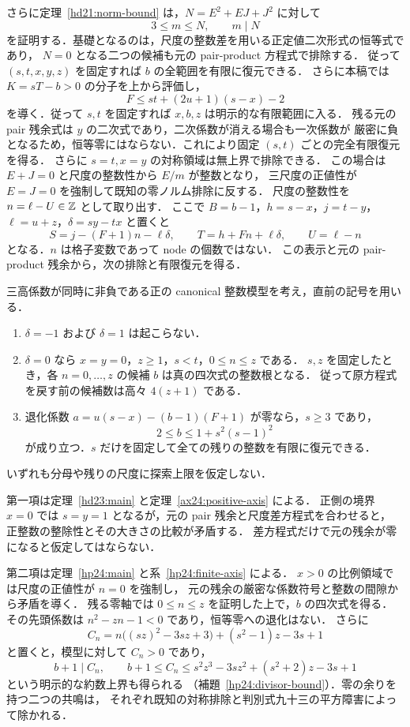 さらに定理~\ref{hd21:norm-bound} は，$N=E^2+EJ+J^2$ に対して
\[
 3\le m\le N,\qquad m\mid N
\]
を証明する．基礎となるのは，尺度の整数差を用いる正定値二次形式の恒等式であり，
$N=0$ となる二つの候補も元の pair-product 方程式で排除する．
従って $(s,t,x,y,z)$ を固定すれば $b$ の全範囲を有限に復元できる．
さらに本稿では $K=sT-b>0$ の分子を上から評価し，
\[
 F\le st+(2u+1)(s-x)-2
\]
を導く．従って $s,t$ を固定すれば $x,b,z$ は明示的な有限範囲に入る．
残る元の pair 残余式は $y$ の二次式であり，二次係数が消える場合も一次係数が
厳密に負となるため，恒等零にはならない．これにより固定 $(s,t)$ ごとの完全有限復元を得る．
さらに $s=t,x=y$ の対称領域は無上界で排除できる．
この場合は $E+J=0$ と尺度の整数性から $E/m$ が整数となり，
三尺度の正値性が $E=J=0$ を強制して既知の零ノルム排除に反する．
尺度の整数性を $n=\ell-U\in\mathbb Z$ として取り出す．
ここで $B=b-1$，$h=s-x$，$j=t-y$，$\ell=u+z$，$\delta=sy-tx$ と置くと
\[
 S=j-(F+1)n-\ell\delta,\qquad
 T=h+Fn+\ell\delta,\qquad U=\ell-n
\]
となる．$n$ は格子変数であって node の個数ではない．
この表示と元の pair-product 残余から，次の排除と有限復元を得る．

\begin{theorem}
\label{ar24:high-D-reductions}
三高係数が同時に非負である正の canonical 整数模型を考え，直前の記号を用いる．
\begin{enumerate}
\item $\delta=-1$ および $\delta=1$ は起こらない．
\item $\delta=0$ なら $x=y=0$，$z\ge1$，$s<t$，$0\le n\le z$ である．
$s,z$ を固定したとき，各 $n=0,\ldots,z$ の候補 $b$ は真の四次式の整数根となる．
従って原方程式を戻す前の候補数は高々 $4(z+1)$ である．
\item 退化係数 $a=u(s-x)-(b-1)(F+1)$ が零なら，$s\ge3$ であり，
\[
 2\le b\le1+s^2(s-1)^2
\]
が成り立つ．$s$ だけを固定して全ての残りの整数を有限に復元できる．
\end{enumerate}
いずれも分母や残りの尺度に探索上限を仮定しない．
\end{theorem}

第一項は定理~\ref{hd23:main} と定理~\ref{ax24:positive-axis} による．
正側の境界 $x=0$ では $s=y=1$ となるが，元の pair 残余と尺度差方程式を合わせると，
正整数の整除性とその大きさの比較が矛盾する．
差方程式だけで元の残余が零になると仮定してはならない．

第二項は定理~\ref{hp24:main} と系~\ref{hp24:finite-axis} による．
$x>0$ の比例領域では尺度の正値性が $n=0$ を強制し，
元の残余の厳密な係数符号と整数の間隙から矛盾を導く．
残る零軸では $0\le n\le z$ を証明した上で，$b$ の四次式を得る．
その先頭係数は $n^2-zn-1<0$ であり，恒等零への退化はない．
さらに
\[
 C_n=n\bigl((sz)^2-3sz+3\bigr)+(s^2-1)z-3s+1
\]
と置くと，模型に対して $C_n>0$ であり，
\[
 b+1\mid C_n,\qquad
 b+1\le C_n\le s^2z^3-3sz^2+(s^2+2)z-3s+1
\]
という明示的な約数上界も得られる
（補題~\ref{hp24:divisor-bound}）．零の余りを持つ二つの共鳴は，
それぞれ既知の対称排除と判別式九十三の平方障害によって除かれる．

